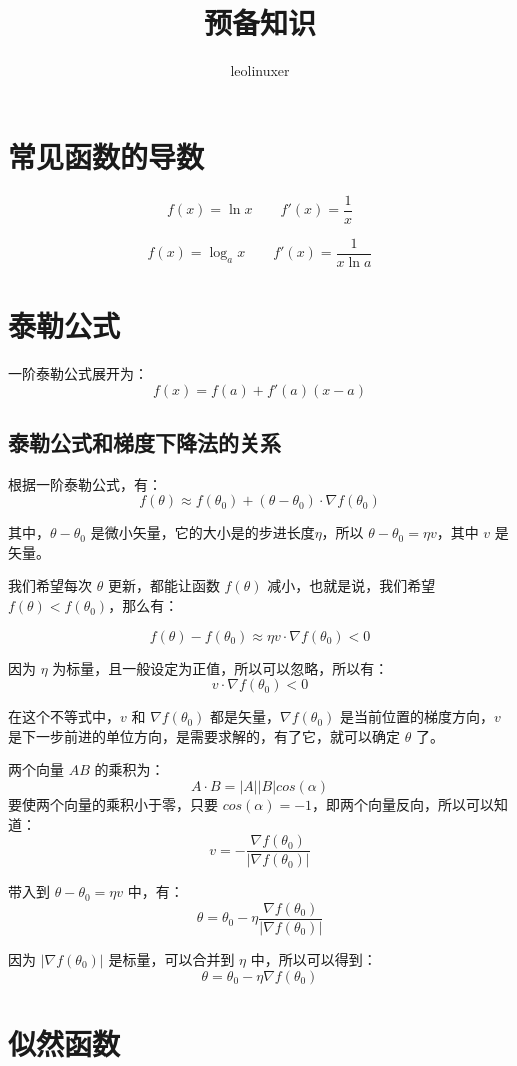 \documentclass[12pt]{article}
\title{预备知识}
\author{leolinuxer}
\begin{document}
\maketitle
\tableofcontents

\section{常见函数的导数}
$$ f(x) = \ln{x} \qquad f'(x) = \frac{1}{x} $$

$$ f(x) = \log_ax \qquad f'(x) = \frac{1}{x\ln{a}} $$

\section{泰勒公式}
一阶泰勒公式展开为：
$$ f(x) = f(a) + f'(a)(x-a) $$

\subsection{泰勒公式和梯度下降法的关系}
根据一阶泰勒公式，有：
$$ f(\theta) \approx f(\theta_0) + (\theta - \theta_0) \cdot \nabla f(\theta_0) $$

其中，$\theta - \theta_0$ 是微小矢量，它的大小是的步进长度$\eta$，所以 $\theta - \theta_0 = \eta v$，其中 $v$ 是矢量。

我们希望每次 $\theta$ 更新，都能让函数 $f(\theta)$ 减小，也就是说，我们希望 $f(\theta) < f(\theta_0)$，那么有：

$$ f(\theta) - f(\theta_0) \approx \eta v \cdot \nabla f(\theta_0) < 0 $$

因为 $\eta$ 为标量，且一般设定为正值，所以可以忽略，所以有：
$$ v \cdot \nabla f(\theta_0) < 0$$

在这个不等式中，$v$ 和 $\nabla f(\theta_0) $ 都是矢量，$\nabla f(\theta_0)$ 是当前位置的梯度方向，$v$ 是下一步前进的单位方向，是需要求解的，有了它，就可以确定 $\theta$ 了。

两个向量 $A B$ 的乘积为：
$$ A \cdot B = |A||B|cos(\alpha)$$
要使两个向量的乘积小于零，只要 $cos(\alpha) = -1$，即两个向量反向，所以可以知道：
$$ v = - \frac{\nabla f(\theta_0)}{|\nabla f(\theta_0)|}$$

带入到 $\theta - \theta_0 = \eta v$ 中，有：
$$ \theta = \theta_0 - \eta \frac{\nabla f(\theta_0)}{|\nabla f(\theta_0)|}$$

因为 $|\nabla f(\theta_0)|$ 是标量，可以合并到 $\eta$ 中，所以可以得到：
$$ \theta = \theta_0 - \eta \nabla f(\theta_0)$$

\section{似然函数}
\end{document}
